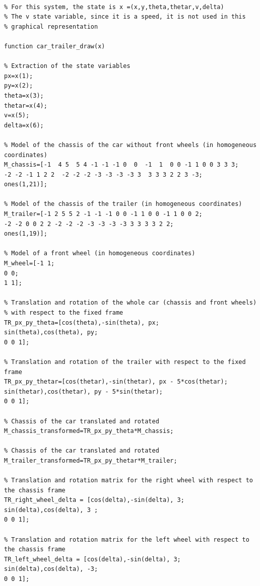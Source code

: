 \documentclass{article}
\begin{document}
\noindent
    \begin{tcolorbox}[
        title={File \texttt{car\_trailer\_draw.m}},
        width=13cm,
    ]
    
\begin{scriptsize}
\begin{verbatim}

% For this system, the state is x =(x,y,theta,thetar,v,delta)
% The v state variable, since it is a speed, it is not used in this 
% graphical representation

function car_trailer_draw(x)

% Extraction of the state variables
px=x(1);
py=x(2);
theta=x(3);
thetar=x(4);
v=x(5);
delta=x(6);

% Model of the chassis of the car without front wheels (in homogeneous coordinates)
M_chassis=[-1  4 5  5 4 -1 -1 -1 0  0  -1  1  0 0 -1 1 0 0 3 3 3; 
-2 -2 -1 1 2 2  -2 -2 -2 -3 -3 -3 -3 3  3 3 3 2 2 3 -3;
ones(1,21)];

% Model of the chassis of the trailer (in homogeneous coordinates)
M_trailer=[-1 2 5 5 2 -1 -1 -1 0 0 -1 1 0 0 -1 1 0 0 2;
-2 -2 0 0 2 2 -2 -2 -2 -3 -3 -3 -3 3 3 3 3 2 2;
ones(1,19)];

% Model of a front wheel (in homogeneous coordinates)
M_wheel=[-1 1;
0 0;
1 1]; 

% Translation and rotation of the whole car (chassis and front wheels) 
% with respect to the fixed frame
TR_px_py_theta=[cos(theta),-sin(theta), px;
sin(theta),cos(theta), py;
0 0 1]; 

% Translation and rotation of the trailer with respect to the fixed frame
TR_px_py_thetar=[cos(thetar),-sin(thetar), px - 5*cos(thetar);
sin(thetar),cos(thetar), py - 5*sin(thetar);
0 0 1];

% Chassis of the car translated and rotated
M_chassis_transformed=TR_px_py_theta*M_chassis;   

% Chassis of the car translated and rotated
M_trailer_transformed=TR_px_py_thetar*M_trailer; 

% Translation and rotation matrix for the right wheel with respect to the chassis frame 
TR_right_wheel_delta = [cos(delta),-sin(delta), 3;
sin(delta),cos(delta), 3 ;
0 0 1]; 

% Translation and rotation matrix for the left wheel with respect to the chassis frame
TR_left_wheel_delta = [cos(delta),-sin(delta), 3;
sin(delta),cos(delta), -3;
0 0 1]; 


\end{verbatim}
\end{scriptsize}
\end{tcolorbox}
\end{document}
